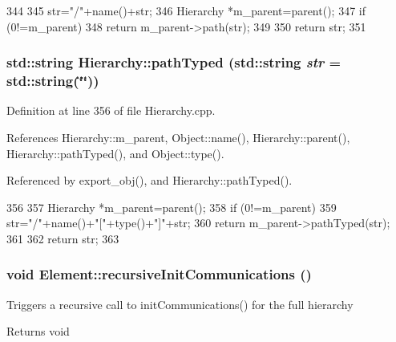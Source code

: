 \begin{DoxyCode}
344                                       {
345   str="/"+name()+str;
346   Hierarchy *m_parent=parent();
347   if (0!=m_parent){
348     return m_parent->path(str);
349   }
350   return str;
351 }
\end{DoxyCode}
\hypertarget{classHierarchy_a1efd56cd164d328d2002e53a10a19b8c}{
\subsubsection[{pathTyped}]{\setlength{\rightskip}{0pt plus 5cm}std::string Hierarchy::pathTyped (std::string {\em str} = {\ttfamily std::string(\char`\"{}\char`\"{})})}}
\label{classHierarchy_a1efd56cd164d328d2002e53a10a19b8c}


Definition at line 356 of file Hierarchy.cpp.

References Hierarchy::m\_\-parent, Object::name(), Hierarchy::parent(), Hierarchy::pathTyped(), and Object::type().

Referenced by export\_\-obj(), and Hierarchy::pathTyped().


\begin{DoxyCode}
356                                            {
357   Hierarchy *m_parent=parent();
358   if (0!=m_parent){
359     str="/"+name()+"["+type()+"]"+str;
360     return m_parent->pathTyped(str);
361   }
362   return str;
363 }
\end{DoxyCode}
\hypertarget{classElement_a82119ed37dff76508a2746a853ec35ba}{
\subsubsection[{recursiveInitCommunications}]{\setlength{\rightskip}{0pt plus 5cm}void Element::recursiveInitCommunications ()}}
\label{classElement_a82119ed37dff76508a2746a853ec35ba}
Triggers a recursive call to initCommunications() for the full hierarchy

\begin{DoxyReturn}{Returns}
void 
\end{DoxyReturn}


